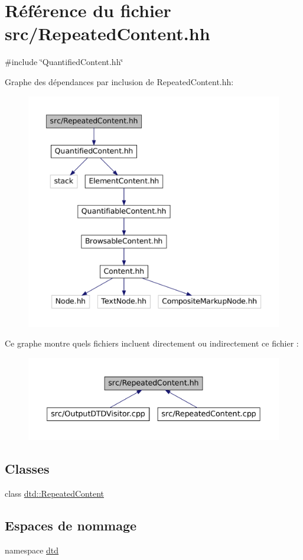 \hypertarget{_repeated_content_8hh}{
\section{Référence du fichier src/RepeatedContent.hh}
\label{_repeated_content_8hh}
}
{\ttfamily \#include \char`\"{}QuantifiedContent.hh\char`\"{}}\par
Graphe des dépendances par inclusion de RepeatedContent.hh:\nopagebreak
\begin{figure}[H]
\begin{center}
\leavevmode
\includegraphics[width=400pt]{_repeated_content_8hh__incl}
\end{center}
\end{figure}
Ce graphe montre quels fichiers incluent directement ou indirectement ce fichier :\nopagebreak
\begin{figure}[H]
\begin{center}
\leavevmode
\includegraphics[width=400pt]{_repeated_content_8hh__dep__incl}
\end{center}
\end{figure}
\subsection*{Classes}
\begin{DoxyCompactItemize}
\item 
class \hyperlink{classdtd_1_1_repeated_content}{dtd::RepeatedContent}
\end{DoxyCompactItemize}
\subsection*{Espaces de nommage}
\begin{DoxyCompactItemize}
\item 
namespace \hyperlink{namespacedtd}{dtd}
\end{DoxyCompactItemize}
